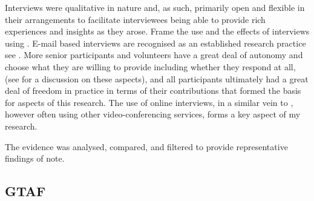 Interviews were qualitative in nature and, as such, primarily open and flexible in their arrangements to facilitate interviewees being able to provide rich experiences and insights as they arose. Frame the use and the effects of interviews using . E-mail based interviews are recognised as an established research practice see . More senior participants and volunteers have a great deal of autonomy and choose what they are willing to provide including whether they respond at all, (see  for a discussion on these aspects), and all participants ultimately had a great deal of freedom in practice in terms of their contributions that formed the basis for aspects of this research. The use of online interviews, in a similar vein to , however often using other video-conferencing services, forms a key aspect of my research.

The evidence was analysed, compared, and filtered to provide representative findings of note. 

\subsection{GTAF}

